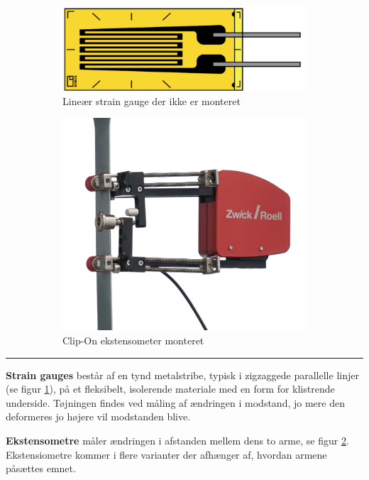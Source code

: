 \begin{figure}[H]
    \centering
    \begin{subfigure}{0.48\textwidth}
        \centering
        \includegraphics[width=0.8\linewidth]{Sections/2 Problemanalyse/Media/strain gauge.png}
        \caption{Lineær strain gauge der ikke er monteret \parencite{IndustrialQuickSearch2025PrinciplesGauges}}
        \label{fig:straingauge}
    \end{subfigure}
    \begin{subfigure}{0.48\textwidth}
        \centering
        \includegraphics[width=0.7\linewidth]{Sections/2 Problemanalyse/Media/ekstensometer.png}
        \caption{Clip-On ekstensometer monteret \parencite{ZwickRoellExtensometers}}
        \label{fig:ekstensometer}
    \end{subfigure}
    \caption{}
    \label{alternativertildic}
\end{figure} \plainbreak{-0.5}

\textbf{Strain gauges} består af en tynd metalstribe, typisk i zigzaggede parallelle linjer (se figur \ref{fig:straingauge}), på et fleksibelt, isolerende materiale med en form for klistrende underside. Tøjningen findes ved måling af ændringen i modstand, jo mere den deformeres jo højere vil modstanden blive. 

\textbf{Ekstensometre} måler ændringen i afstanden mellem dens to arme, se figur \ref{fig:ekstensometer}. Ekstensiometre kommer i flere varianter der afhænger af,  hvordan armene påsættes emnet.


